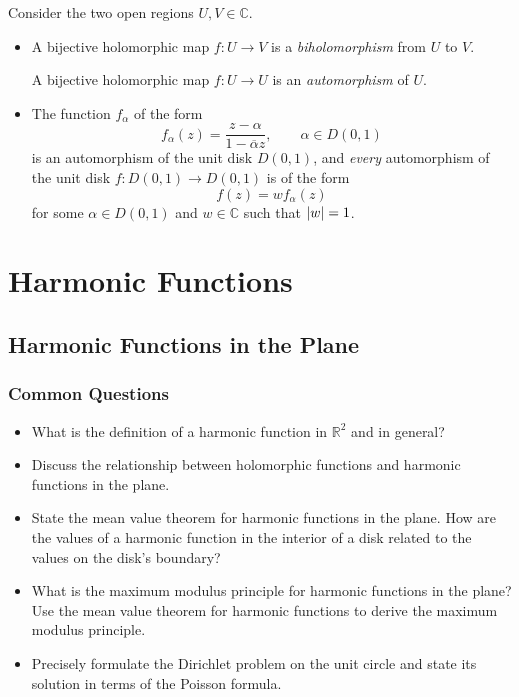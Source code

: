 \documentclass[11pt, a4paper]{article}
\newcommand{\R}{\mathbb{R}} %
\newcommand{\C}{\mathbb{C}} %
\begin{document}
Consider the two open regions $ U, V \in \C $.
\begin{itemize}
	\item A bijective holomorphic map $ f : U \to V $ is a \textit{biholomorphism} from $ U $ to $ V $.
	
	A bijective holomorphic map $ f: U \to U $ is an \textit{automorphism} of $ U $.
	
	\item The function $ f_{\alpha} $ of the form
		\begin{equation*}
			f_{\alpha}(z) = \frac{z - \alpha}{1 - \overline{\alpha}z}, \qquad \alpha \in D(0, 1)
		\end{equation*}
		is an automorphism of the unit disk $ D(0, 1) $, and \textit{every} automorphism of the unit disk $ f: D(0, 1) \to D(0, 1) $ is of the form 
		\begin{equation*}
			f(z) = w f_{\alpha}(z)
		\end{equation*}
		for some $ \alpha \in D(0, 1) $ and $ w \in \C $ such that $ \abs{w} = 1 $.
\end{itemize}

\newpage
\section{Harmonic Functions}

\subsection{Harmonic Functions in the Plane}
\subsubsection{Common Questions}
\begin{itemize}
	\item What is the definition of a harmonic function in $ \R^{2} $ and in general?
	
	\item Discuss the relationship between holomorphic functions and harmonic functions in the plane.
	
	\item State the mean value theorem for harmonic functions in the plane. How are the values of a harmonic function in the interior of a disk related to the values on the disk's boundary?
	
	\item What is the maximum modulus principle for harmonic functions in the plane? Use the mean value theorem for harmonic functions to derive the maximum modulus principle.
	
	
	\item Precisely formulate the Dirichlet problem on the unit circle and state its solution in terms of the Poisson formula.
\end{itemize}
\end{document}
